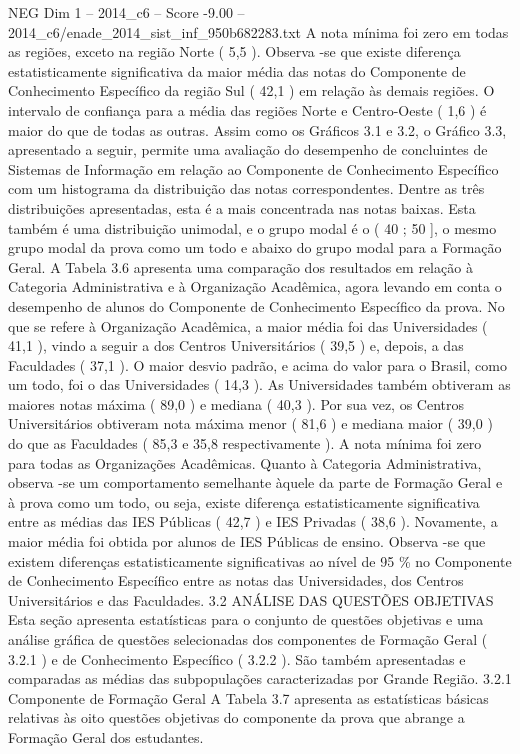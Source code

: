 \begin{textsample}{NEG Dim 1 – 2014\_c6 – Score -9.00 – 2014\_c6/enade\_2014\_sist\_inf\_950b682283.txt}
A nota mínima foi zero em todas as regiões, exceto na região Norte ( 5,5 ).
Observa -se que existe diferença estatisticamente significativa da maior média das notas do Componente de Conhecimento Específico da região Sul ( 42,1 ) em relação às demais regiões.
O intervalo de confiança para a média das regiões Norte e Centro-Oeste ( 1,6 ) é maior do que de todas as outras.
Assim como os Gráficos 3.1 e 3.2, o Gráfico 3.3, apresentado a seguir, permite uma avaliação do desempenho de concluintes de Sistemas de Informação em relação ao Componente de Conhecimento Específico com um histograma da distribuição das notas correspondentes.
Dentre as três distribuições apresentadas, esta é a mais concentrada nas notas baixas.
Esta também é uma distribuição unimodal, e o grupo modal é o ( 40 ; 50 ], o mesmo grupo modal da prova como um todo e abaixo do grupo modal para a Formação Geral.
A Tabela 3.6 apresenta uma comparação dos resultados em relação à Categoria Administrativa e à Organização Acadêmica, agora levando em conta o desempenho de alunos do Componente de Conhecimento Específico da prova.
No que se refere à Organização Acadêmica, a maior média foi das Universidades ( 41,1 ), vindo a seguir a dos Centros Universitários ( 39,5 ) e, depois, a das Faculdades ( 37,1 ).
O maior desvio padrão, e acima do valor para o Brasil, como um todo, foi o das Universidades ( 14,3 ).
As Universidades também obtiveram as maiores notas máxima ( 89,0 ) e mediana ( 40,3 ).
Por sua vez, os Centros Universitários obtiveram nota máxima menor ( 81,6 ) e mediana maior ( 39,0 ) do que as Faculdades ( 85,3 e 35,8 respectivamente ).
A nota mínima foi zero para todas as Organizações Acadêmicas.
Quanto à Categoria Administrativa, observa -se um comportamento semelhante àquele da parte de Formação Geral e à prova como um todo, ou seja, existe diferença estatisticamente significativa entre as médias das IES Públicas ( 42,7 ) e IES Privadas ( 38,6 ).
Novamente, a maior média foi obtida por alunos de IES Públicas de ensino.
Observa -se que existem diferenças estatisticamente significativas ao nível de 95 \% no Componente de Conhecimento Específico entre as notas das Universidades, dos Centros Universitários e das Faculdades. 3.2 ANÁLISE DAS QUESTÕES OBJETIVAS Esta seção apresenta estatísticas para o conjunto de questões objetivas e uma análise gráfica de questões selecionadas dos componentes de Formação Geral ( 3.2.1 ) e de Conhecimento Específico ( 3.2.2 ).
São também apresentadas e comparadas as médias das subpopulações caracterizadas por Grande Região. 3.2.1 Componente de Formação Geral A Tabela 3.7 apresenta as estatísticas básicas relativas às oito questões objetivas do componente da prova que abrange a Formação Geral dos estudantes.

\end{textsample}
